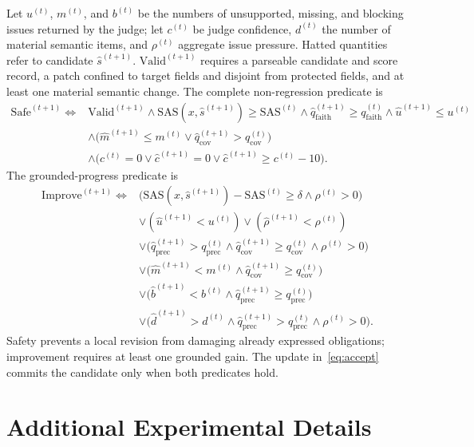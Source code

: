 \documentclass{article}
\begin{document}
Let $u^{(t)}$, $m^{(t)}$, and $b^{(t)}$ be the numbers of unsupported, missing, and blocking issues returned by the judge; let $c^{(t)}$ be judge confidence, $d^{(t)}$ the number of material semantic items, and $\rho^{(t)}$ aggregate issue pressure. Hatted quantities refer to candidate $\hat{s}^{(t+1)}$. $\mathrm{Valid}^{(t+1)}$ requires a parseable candidate and score record, a patch confined to target fields and disjoint from protected fields, and at least one material semantic change. The complete non-regression predicate is
\begin{align}
\mathrm{Safe}^{(t+1)}\Longleftrightarrow{}&
\mathrm{Valid}^{(t+1)}
\land \mathrm{SAS}(x,\hat{s}^{(t+1)})\geq\mathrm{SAS}^{(t)}
\land \hat q_{\mathrm{faith}}^{(t+1)}\geq q_{\mathrm{faith}}^{(t)}
\land \hat u^{(t+1)}\leq u^{(t)} \nonumber\\
&\land\bigl(\hat m^{(t+1)}\leq m^{(t)}
\lor \hat q_{\mathrm{cov}}^{(t+1)}>q_{\mathrm{cov}}^{(t)}\bigr) \nonumber\\
&\land\bigl(c^{(t)}=0\lor\hat c^{(t+1)}=0
\lor\hat c^{(t+1)}\geq c^{(t)}-10\bigr).
\label{eq:safe-full}
\end{align}
The grounded-progress predicate is
\begin{align}
\mathrm{Improve}^{(t+1)}\Longleftrightarrow{}&
\bigl(\mathrm{SAS}(x,\hat{s}^{(t+1)})-\mathrm{SAS}^{(t)}\geq\delta
\land\rho^{(t)}>0\bigr) \nonumber\\
&\lor(\hat u^{(t+1)}<u^{(t)})
\lor(\hat\rho^{(t+1)}<\rho^{(t)}) \nonumber\\
&\lor\bigl(\hat q_{\mathrm{prec}}^{(t+1)}>q_{\mathrm{prec}}^{(t)}
\land\hat q_{\mathrm{cov}}^{(t+1)}\geq q_{\mathrm{cov}}^{(t)}
\land\rho^{(t)}>0\bigr) \nonumber\\
&\lor\bigl(\hat m^{(t+1)}<m^{(t)}
\land\hat q_{\mathrm{cov}}^{(t+1)}\geq q_{\mathrm{cov}}^{(t)}\bigr) \nonumber\\
&\lor\bigl(\hat b^{(t+1)}<b^{(t)}
\land\hat q_{\mathrm{prec}}^{(t+1)}\geq q_{\mathrm{prec}}^{(t)}\bigr) \nonumber\\
&\lor\bigl(\hat d^{(t+1)}>d^{(t)}
\land\hat q_{\mathrm{prec}}^{(t+1)}>q_{\mathrm{prec}}^{(t)}
\land\rho^{(t)}>0\bigr).
\label{eq:improve-full}
\end{align}
Safety prevents a local revision from damaging already expressed obligations; improvement requires at least one grounded gain. The update in~\eqref{eq:accept} commits the candidate only when both predicates hold.

\section{Additional Experimental Details}
\label{app:additional-results}
\end{document}
